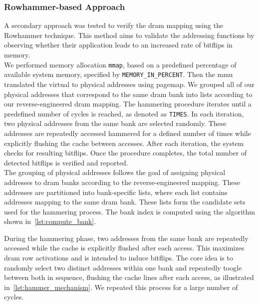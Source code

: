     \subsubsection{Rowhammer-based Approach} \label{subsubsec:rowhammer}
        A secondary approach was tested to verify the \gls{dram} mapping using the Rowhammer technique. This 
        method aims to validate the addressing functions by observing whether their application leads 
        to an increased rate of bitflips in memory.
        \\
        We performed memory allocation \texttt{mmap}, based on a predefined percentage of available system 
        memory, specified by \texttt{MEMORY\_IN\_PERCENT}. Then the \gls{mmu} translated the virtual to physical 
        addresses using pagemap. We grouped all of our physical addresses that correspond to the 
        same \gls{dram} bank into lists according to our reverse-engineered \gls{dram} mapping.
        The hammering procedure iterates until a predefined number of cycles is reached, as denoted as
        \texttt{TIMES}. In each iteration, two physical addresses from the same bank are 
        selected randomly. These addresses are repeatedly accessed hammered for a defined number of 
        times while explicitly flushing the cache between accesses. After each 
        iteration, the system checks for resulting bitflips. Once the procedure completes, the total 
        number of detected bitflips is verified and reported.
        \\
        The grouping of physical addresses follows the goal of assigning physical addresses to \gls{dram} banks 
        according to the reverse-engineered mapping. These addresses are partitioned into bank-specific 
        lists, where each list contains addresses mapping to the same \gls{dram} bank. These lists form 
        the candidate sets used for the hammering process. The bank index is computed using the 
        algorithm shown in~\cref{lst:compute_bank}.
        
        
        During the hammering phase, two addresses from the same bank are repeatedly accessed while 
        the cache is explicitly flushed after each access. This maximizes \gls{dram} row activations and is 
        intended to induce bitflips. The core idea is to randomly select two distinct addresses within 
        one bank and repeatedly toogle between both in sequence, flushing the cache lines after each access, as illustrated in~\cref{lst:hammer_mechanism}. We repeated this process 
        for a large number of cycles.
        

